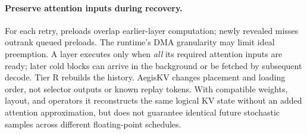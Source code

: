 \paragraph{Preserve attention inputs during recovery.}
For each retry, preloads overlap earlier-layer computation; newly
revealed misses outrank queued preloads. The runtime's DMA granularity
may limit ideal preemption. A layer executes only when \emph{all} its
required attention inputs are ready; later cold blocks can arrive in
the background or be fetched by subsequent decode. Tier R rebuilds
the history. AegisKV changes placement and loading order, not selector
outputs or known replay tokens. With compatible weights, layout, and
operators it reconstructs the same logical KV state without an added
attention approximation, but does not guarantee identical future
stochastic samples across different floating-point schedules.
